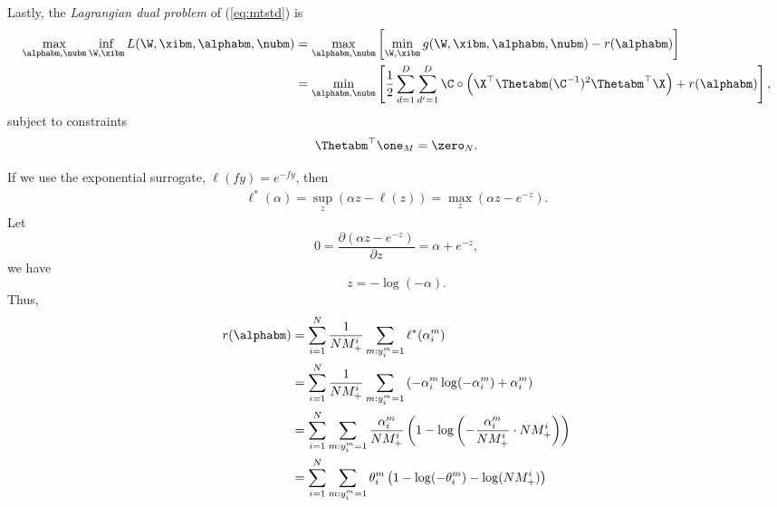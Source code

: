 Lastly, the \emph{Lagrangian dual problem} of (\ref{eq:mtstd}) is
\begin{equation}
\label{eq:mtdual}
\begin{aligned}
\max_{\alphabm, \nubm} \inf_{\W, \xibm} L(\W, \xibm, \alphabm, \nubm) 
&= \max_{\alphabm, \nubm} \left[ \min_{\W, \xibm} g(\W, \xibm, \alphabm, \nubm) - r(\alphabm) \right] \\
&= \min_{\alphabm, \nubm} \left[ \frac{1}{2} \sum_{d=1}^{D} \sum_{d'=1}^{D} \C \circ \left( \X^\top \Thetabm (\C^{-1})^2 \Thetabm^\top \X \right) 
   + r(\alphabm) \right], \\
\end{aligned}
\end{equation}
subject to constraints
\begin{equation*}
\Thetabm^\top \one_M = \zero_{N}.
\end{equation*}

If we use the exponential surrogate, \ie $\ell(fy) = e^{-fy}$, then
\begin{equation*}
\begin{aligned}
\ell^*(\alpha) = \sup_z (\alpha z - \ell(z) ) = \max_z (\alpha z - e^{-z}).
\end{aligned}
\end{equation*}
Let 
\begin{equation*}
0 = \frac{\partial (\alpha z - e^{-z})} {\partial z} = \alpha + e^{-z},
\end{equation*}
we have 
\begin{equation*}
z = -\log(-\alpha).
\end{equation*}
Thus, 
\begin{equation*}
\begin{aligned}
r(\alphabm) 
&= \sum_{i = 1}^{N} \frac{1}{N M_+^i} \sum_{m: y_i^m = 1} \ell^*(\alpha_i^m) \\
&= \sum_{i = 1}^{N} \frac{1}{N M_+^i} \sum_{m: y_i^m = 1} \left( -\alpha_i^m \log(-\alpha_i^m) + \alpha_i^m \right) \\
&= \sum_{i = 1}^{N} \sum_{m: y_i^m = 1} \frac{\alpha_i^m}{N M_+^i} \left(1 - \log \left( -\frac{\alpha_i^m}{N M_+^i} 
   \cdot N M_+^i \right) \right) \\
&= \sum_{i = 1}^{N} \sum_{m: y_i^m = 1} \theta_i^m \left( 1 - \log(-\theta_i^m) - \log(N M_+^i) \right)
\end{aligned}
\end{equation*}
